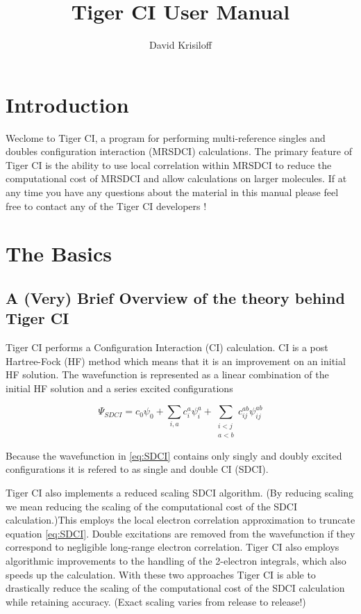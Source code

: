 \documentclass{article}
\begin{document}
\title{Tiger CI User Manual}
\author{David Krisiloff}
\maketitle

\tableofcontents



\section{Introduction}\begin{flushleft}\end{flushleft}
Weclome to Tiger CI, a program for performing multi-reference singles and doubles configuration interaction (MRSDCI) calculations. The primary feature of Tiger CI is the ability to use local correlation within MRSDCI to reduce the computational cost of MRSDCI and allow calculations on larger molecules. If at any time you have any questions about the material in this manual please feel free to contact any of the Tiger CI developers ! 

\section{The Basics}
\subsection{A (Very) Brief Overview of the theory behind Tiger CI}
Tiger CI performs a Configuration Interaction (CI) calculation. CI is a post Hartree-Fock (HF) method which means that it is an improvement on an initial HF solution. The wavefunction is represented as a linear combination of the initial HF solution and a series excited configurations

\begin{equation} \label{eq:SDCI}
\Psi_{SDCI} = c_0\psi_0 + \sum_{i,a}c_i^a\psi_i^a + \sum_{\substack{i<j\\a<b}} c_{ij}^{ab}\psi_{ij}^{ab}
\end{equation}  

Because the wavefunction in \eqref{eq:SDCI} contains only singly and doubly excited configurations it is refered to as single and double CI (SDCI). 

Tiger CI also implements a reduced scaling SDCI algorithm. (By reducing scaling we mean reducing the scaling of the computational cost of the SDCI calculation.)This employs the local electron correlation approximation to truncate equation \eqref{eq:SDCI}. Double excitations are removed from the wavefunction if they correspond to negligible long-range electron correlation. Tiger CI also employs algorithmic improvements to the handling of the 2-electron integrals, which also speeds up the calculation. With these two approaches Tiger CI is able to drastically reduce the scaling of the computational cost of the SDCI calculation while retaining accuracy. (Exact scaling varies from release to release!)
\end{document}
